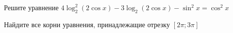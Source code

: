 \begin{ex}
	\begin{condition}
		\begin{enumcols}[label=\asbuk*)]
			\item Решите уравнение \( 4\log_2^2 (2\cos x ) - 3\log_2 (2\cos x) -\sin^2 x = \cos^2 x \)
			\item Найдите все корни уравнения, принадлежащие отрезку \( \left[2\pi;3\pi\right] \)
		\end{enumcols}
	\end{condition}
\end{ex}